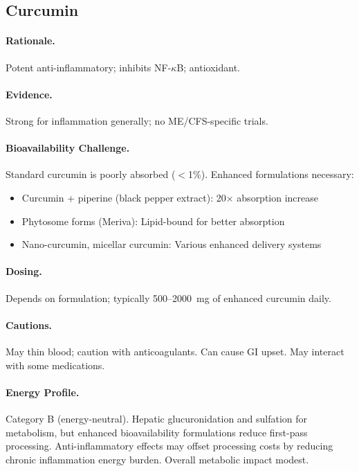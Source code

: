 \subsection{Curcumin}

\paragraph{Rationale.} Potent anti-inflammatory; inhibits NF-$\kappa$B; antioxidant.

\paragraph{Evidence.} Strong for inflammation generally; no ME/CFS-specific trials.

\paragraph{Bioavailability Challenge.} Standard curcumin is poorly absorbed ($<$1\%). Enhanced formulations necessary:
\begin{itemize}
    \item Curcumin + piperine (black pepper extract): 20$\times$ absorption increase
    \item Phytosome forms (Meriva): Lipid-bound for better absorption
    \item Nano-curcumin, micellar curcumin: Various enhanced delivery systems
\end{itemize}

\paragraph{Dosing.} Depends on formulation; typically 500--2000~mg of enhanced curcumin daily.

\paragraph{Cautions.} May thin blood; caution with anticoagulants. Can cause GI upset. May interact with some medications.

\paragraph{Energy Profile.}
Category B (energy-neutral). Hepatic glucuronidation and sulfation for metabolism, but enhanced bioavailability formulations reduce first-pass processing. Anti-inflammatory effects may offset processing costs by reducing chronic inflammation energy burden. Overall metabolic impact modest.

